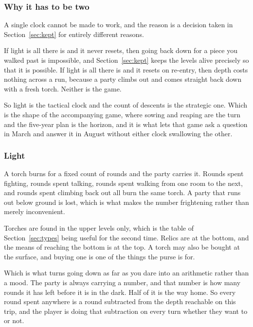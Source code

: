 \documentclass[11pt,a4paper]{article}
\begin{document}
\subsubsection*{Why it has to be two}

A single clock cannot be made to work, and the reason is a decision taken in
Section~\ref{sec:kept} for entirely different reasons.

If light is all there is and it never resets, then going back down for a piece you walked past is
impossible, and Section~\ref{sec:kept} keeps the levels alive precisely so that it is possible.
If light is all there is and it resets on re-entry, then depth costs nothing across a run, because
a party climbs out and comes straight back down with a fresh torch. Neither is the game.

\begin{sectionbox}
So light is the tactical clock and the count of descents is the strategic one. Which is the shape
of the accompanying game, where sowing and reaping are the turn and the five-year plan is the
horizon, and it is what lets that game ask a question in March and answer it in August without
either clock swallowing the other.
\end{sectionbox}

\subsubsection*{Light}

A torch burns for a fixed count of rounds and the party carries it. Rounds spent fighting, rounds
spent talking, rounds spent walking from one room to the next, and rounds spent climbing back out
all burn the same torch. A party that runs out below ground is lost, which is what makes the
number frightening rather than merely inconvenient.

Torches are found in the upper levels only, which is the table of Section~\ref{sec:types} being
useful for the second time. Relics are at the bottom, and the means of reaching the bottom is at
the top. A torch may also be bought at the surface, and buying one is one of the things the purse
is for.

\begin{sectionbox}
Which is what turns going down as far as you dare into an arithmetic rather than a mood. The
party is always carrying a number, and that number is how many rounds it has left before it is in
the dark. Half of it is the way home. So every round spent anywhere is a round subtracted from the
depth reachable on this trip, and the player is doing that subtraction on every turn whether they
want to or not.
\end{sectionbox}
\end{document}
